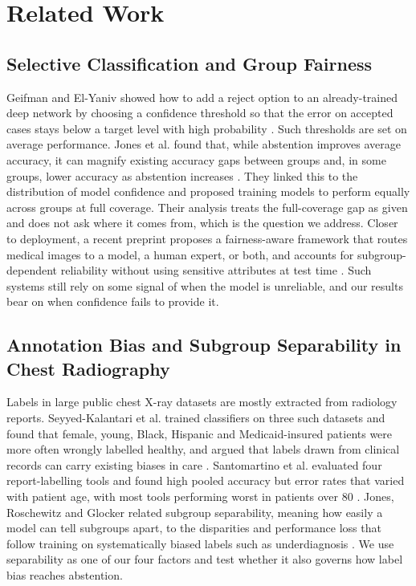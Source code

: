 \section{Related Work}

\subsection{Selective Classification and Group Fairness}
Geifman and El-Yaniv showed how to add a reject option to an already-trained deep network by choosing a confidence threshold so that the error on accepted cases stays below a target level with high probability \cite{geifman2017}. Such thresholds are set on average performance. Jones et al. found that, while abstention improves average accuracy, it can magnify existing accuracy gaps between groups and, in some groups, lower accuracy as abstention increases \cite{jones2021}. They linked this to the distribution of model confidence and proposed training models to perform equally across groups at full coverage. Their analysis treats the full-coverage gap as given and does not ask where it comes from, which is the question we address. Closer to deployment, a recent preprint proposes a fairness-aware framework that routes medical images to a model, a human expert, or both, and accounts for subgroup-dependent reliability without using sensitive attributes at test time \cite{zhang2026}. Such systems still rely on some signal of when the model is unreliable, and our results bear on when confidence fails to provide it.

\subsection{Annotation Bias and Subgroup Separability in Chest Radiography}
Labels in large public chest X-ray datasets are mostly extracted from radiology reports. Seyyed-Kalantari et al. trained classifiers on three such datasets and found that female, young, Black, Hispanic and Medicaid-insured patients were more often wrongly labelled healthy, and argued that labels drawn from clinical records can carry existing biases in care \cite{seyyedkalantari2021}. Santomartino et al. evaluated four report-labelling tools and found high pooled accuracy but error rates that varied with patient age, with most tools performing worst in patients over 80 \cite{santomartino2024}. Jones, Roschewitz and Glocker related subgroup separability, meaning how easily a model can tell subgroups apart, to the disparities and performance loss that follow training on systematically biased labels such as underdiagnosis \cite{jones2023}. We use separability as one of our four factors and test whether it also governs how label bias reaches abstention.

